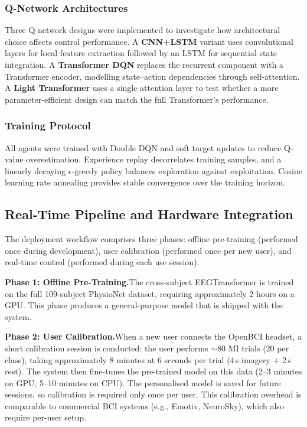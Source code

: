 \documentclass[12pt, a4paper]{article}
\begin{document}
\subsubsection{Q-Network Architectures}

Three Q-network designs were implemented to investigate how architectural choice affects control performance. A \textbf{CNN+LSTM} variant uses convolutional layers for local feature extraction followed by an LSTM for sequential state integration. A \textbf{Transformer DQN} replaces the recurrent component with a Transformer encoder, modelling state--action dependencies through self-attention. A \textbf{Light Transformer} uses a single attention layer to test whether a more parameter-efficient design can match the full Transformer's performance.

\subsubsection{Training Protocol}

All agents were trained with Double DQN and soft target updates to reduce Q-value overestimation. Experience replay decorrelates training samples, and a linearly decaying $\epsilon$-greedy policy balances exploration against exploitation. Cosine learning rate annealing provides stable convergence over the training horizon.

\subsection{Real-Time Pipeline and Hardware Integration}

The deployment workflow comprises three phases: offline pre-training (performed once during development), user calibration (performed once per new user), and real-time control (performed during each use session).

\textbf{Phase 1: Offline Pre-Training.}\quad The cross-subject EEGTransformer is trained on the full 109-subject PhysioNet dataset, requiring approximately 2 hours on a GPU. This phase produces a general-purpose model that is shipped with the system.

\textbf{Phase 2: User Calibration.}\quad When a new user connects the OpenBCI headset, a short calibration session is conducted: the user performs $\sim$80 MI trials (20 per class), taking approximately 8 minutes at 6 seconds per trial (4\,s imagery + 2\,s rest). The system then fine-tunes the pre-trained model on this data (2--3 minutes on GPU, 5--10 minutes on CPU). The personalised model is saved for future sessions, so calibration is required only once per user. This calibration overhead is comparable to commercial BCI systems (e.g., Emotiv, NeuroSky), which also require per-user setup.
\end{document}
